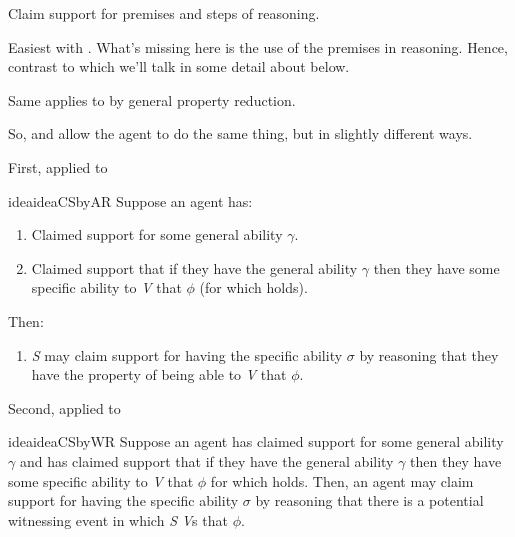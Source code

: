 \begin{note}
  Claim support for premises and steps of reasoning.

  Easiest with \WR{}.
  What's missing here is the use of the premises in reasoning.
  Hence, contrast to \ESU{} which we'll talk in some detail about below.

  Same applies to \AR{} by general property reduction.

  So, \AR{} and \WR{} allow the agent to do the same thing, but in slightly different ways.
\end{note}

\begin{note}[\gsi{}++]
  First, \gsi{} applied to \AR{}
  \begin{restatable}{idea}{ideaCSbyAR}\label{idea:CS-by-AR}
    Suppose an agent has:
    \begin{enumerate}
    \item Claimed support for some general ability \(\gamma\).
    \item Claimed support that if they have the general ability \(\gamma\) then they have some specific ability to \emph{V} that \(\phi\) (for which  holds).
    \end{enumerate}
    Then:
    \begin{enumerate}[resume]
    \item \emph{S} may claim support for having the specific ability \(\sigma\) by reasoning that they have the property of being able to \emph{V} that \(\phi\).
    \end{enumerate}
    \vspace{-\baselineskip}
  \end{restatable}

  Second, \gsi{} applied to \WR{}

  \begin{restatable}{idea}{ideaCSbyWR}\label{idea:CS-by-WR}\label{W:s}
    Suppose an agent has claimed support for some general ability \(\gamma\) and has claimed support that if they have the general ability \(\gamma\) then they have some specific ability to \emph{V} that \(\phi\) for which  holds.
    Then, an agent may claim support for having the specific ability \(\sigma\) by reasoning that there is a potential witnessing event in which \emph{S} \emph{V}s that \(\phi\).
  \end{restatable}
\end{note}

